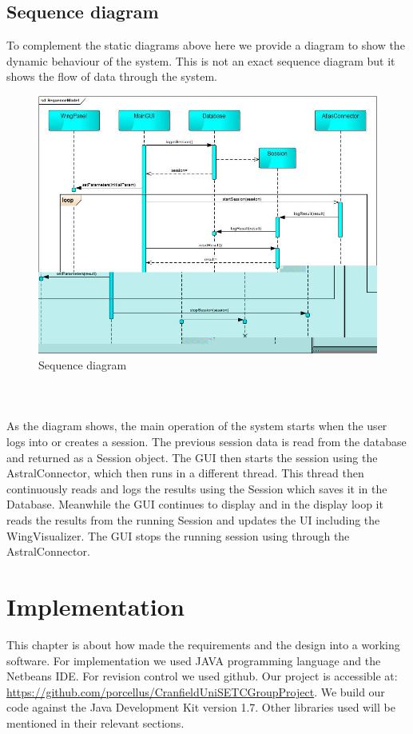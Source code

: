\documentclass[10pt,a4paper]{report}
\begin{document}
\section{Sequence diagram}
To complement the static diagrams above here we provide a diagram to show the dynamic behaviour of the system. This is not an exact sequence diagram but it shows the flow of data through the system.\\
\begin{figure}[h!]
\includegraphics[width=\textwidth]{SequenceModel.jpg}
\caption{Sequence diagram}
\end{figure}\\
\paragraph*{}
As the diagram shows, the main operation of the system starts when the user logs into or creates a session. The previous session data is read from the database and returned as a Session object. The GUI then starts the session using the AstralConnector, which then runs in a different thread. This thread then continuously reads and logs the results using the Session which saves it in the Database. Meanwhile the GUI continues to display and in the display loop it reads the results from the running Session and updates the UI including the WingVisualizer. The GUI stops the running session using through the AstralConnector.

\chapter{Implementation}
\label{ch:impl}
This chapter is about how made the requirements and the design into a working software. For implementation we used JAVA programming language and the Netbeans IDE. For revision control we used github. Our project is accessible at: \url{https://github.com/porcellus/CranfieldUniSETCGroupProject}. We build our code against the Java Development Kit version 1.7. Other libraries used will be mentioned in their relevant sections.
\end{document}
